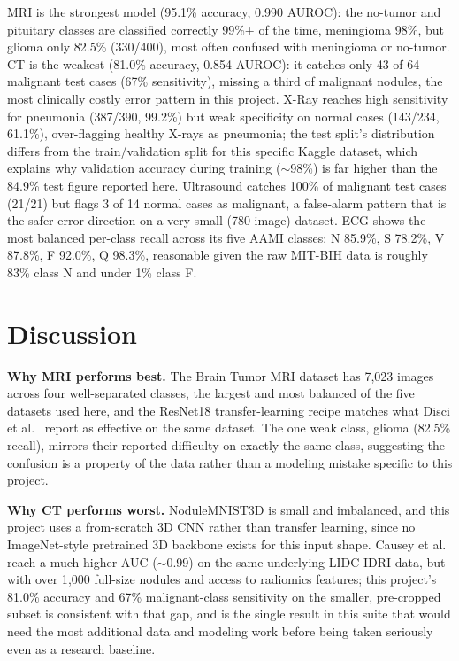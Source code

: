 \documentclass[conference]{IEEEtran}
\begin{document}
MRI is the strongest model (95.1\% accuracy, 0.990 AUROC): the no-tumor and pituitary classes are classified correctly 99\%+ of the time, meningioma 98\%, but glioma only 82.5\% (330/400), most often confused with meningioma or no-tumor. CT is the weakest (81.0\% accuracy, 0.854 AUROC): it catches only 43 of 64 malignant test cases (67\% sensitivity), missing a third of malignant nodules, the most clinically costly error pattern in this project. X-Ray reaches high sensitivity for pneumonia (387/390, 99.2\%) but weak specificity on normal cases (143/234, 61.1\%), over-flagging healthy X-rays as pneumonia; the test split's distribution differs from the train/validation split for this specific Kaggle dataset, which explains why validation accuracy during training ($\sim$98\%) is far higher than the 84.9\% test figure reported here. Ultrasound catches 100\% of malignant test cases (21/21) but flags 3 of 14 normal cases as malignant, a false-alarm pattern that is the safer error direction on a very small (780-image) dataset. ECG shows the most balanced per-class recall across its five AAMI classes: N 85.9\%, S 78.2\%, V 87.8\%, F 92.0\%, Q 98.3\%, reasonable given the raw MIT-BIH data is roughly 83\% class N and under 1\% class F.

\section{Discussion}
\label{sec:discussion}

\textbf{Why MRI performs best.} The Brain Tumor MRI dataset has 7{,}023 images across four well-separated classes, the largest and most balanced of the five datasets used here, and the ResNet18 transfer-learning recipe matches what Disci et al.~\cite{mri_cancers} report as effective on the same dataset. The one weak class, glioma (82.5\% recall), mirrors their reported difficulty on exactly the same class, suggesting the confusion is a property of the data rather than a modeling mistake specific to this project.

\textbf{Why CT performs worst.} NoduleMNIST3D is small and imbalanced, and this project uses a from-scratch 3D CNN rather than transfer learning, since no ImageNet-style pretrained 3D backbone exists for this input shape. Causey et al.~\cite{nodulex} reach a much higher AUC ($\sim$0.99) on the same underlying LIDC-IDRI data, but with over 1{,}000 full-size nodules and access to radiomics features; this project's 81.0\% accuracy and 67\% malignant-class sensitivity on the smaller, pre-cropped subset is consistent with that gap, and is the single result in this suite that would need the most additional data and modeling work before being taken seriously even as a research baseline.
\end{document}
